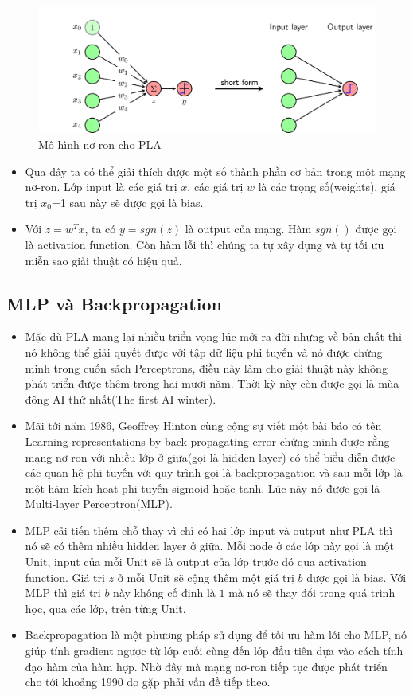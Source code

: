 \begin{figure}[ht]
\centering
        \includegraphics[totalheight=5cm]{Images/first_ann.png}
    \caption{Mô hình nơ-ron cho PLA \cite{basicdeep}}
    \label{pla}
\end{figure}

\begin{itemize}
\item Qua đây ta có thể giải thích được một số thành phần cơ bản trong một mạng nơ-ron. Lớp input là các giá trị $x$, các giá trị $w$ là các trọng số(weights), giá trị $x_{0}$=1 sau này sẽ được gọi là bias.
\item Với $z = w^{T}x$, ta có $y=sgn(z)$ là output của mạng. Hàm $sgn()$ được gọi là activation function.
Còn hàm lỗi thì chúng ta tự xây dựng và tự tối ưu miễn sao giải thuật có hiệu quả.
\end{itemize}
\subsection{MLP và Backpropagation}
\begin{itemize}
\item Mặc dù PLA mang lại nhiều triển vọng lúc mới ra đời nhưng về bản chất thì nó không thể giải quyết được với tập dữ liệu phi tuyến và nó được chứng minh trong cuốn sách Perceptrons, điều này làm cho giải thuật này không phát triển được thêm trong hai mươi năm. Thời kỳ này còn được gọi là mùa đông AI thứ nhất(The first AI winter).
\item Mãi tới năm 1986, Geoffrey Hinton cùng cộng sự viết một bài báo có tên Learning representations by back propagating error chứng minh được rằng mạng nơ-ron với nhiều lớp ở giữa(gọi là hidden layer) có thể biểu diễn được các quan hệ phi tuyến với quy trình gọi là backpropagation và sau mỗi lớp là một hàm kích hoạt phi tuyến sigmoid hoặc tanh. Lúc này nó được gọi là Multi-layer Perceptron(MLP).
\item MLP cải tiến thêm chỗ thay vì chỉ có hai lớp input và output như PLA thì nó sẽ có thêm nhiều hidden layer ở giữa. Mỗi node ở các lớp này gọi là một Unit, input của mỗi Unit sẽ là output của lớp trước đó qua activation function. Giá trị $z$ ở mỗi Unit sẽ cộng thêm một giá trị $b$ được gọi là bias. Với MLP thì giá trị $b$ này không cố định là $1$ mà nó sẽ thay đổi trong quá trình học, qua các lớp, trên từng Unit.
\item Backpropagation là một phương pháp sử dụng để tối ưu hàm lỗi cho MLP, nó giúp tính gradient ngược từ lớp cuối cùng đến lớp đầu tiên dựa vào cách tính đạo hàm của hàm hợp. Nhờ đây mà mạng nơ-ron tiếp tục được phát triển cho tới khoảng 1990 do gặp phải vấn đề tiếp theo.
\end{itemize}
